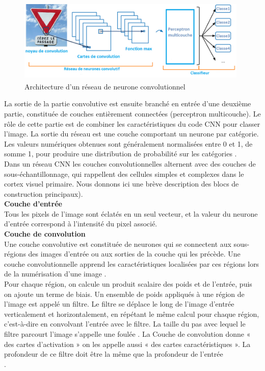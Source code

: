 \begin{figure}[h]
      \centering
      \includegraphics[width=11cm,height=4cm]{images/arch-cnn.png}
      \caption{Architecture d'un réseau de neurone convolutionnel}
    \label{fig:archh}
\end{figure}

La sortie de la partie convolutive est ensuite branché en entrée d’une deuxième partie, constituée de couches entièrement connectées (perceptron multicouche). Le rôle de cette partie est de combiner les caractéristiques du code CNN pour classer l’image. La sortie du réseau est une couche comportant un neurone par catégorie. Les valeurs numériques obtenues sont
généralement normalisées entre 0 et 1, de somme 1, pour produire une distribution de probabilité sur les catégories \cite{58}.\\
Dans un réseau CNN les couches convolutionnelles alternent avec des couches de sous-échantillonnage, qui rappellent des cellules simples et complexes dans le cortex visuel primaire.
Nous donnons ici une brève description des blocs de construction principaux).\\

{\textbf{Couche d'entrée}}\\

Tous les pixels de l’image sont éclatés en un seul vecteur, et la valeur du neurone d’entrée correspond à l’intensité du pixel associé.\\

{\textbf{Couche de convolution}}\\

Une couche convolutive est constituée de neurones qui se connectent aux sous-régions des images d'entrée ou aux sorties de la couche qui les précède. Une couche convolutionnelle apprend les caractéristiques localisées par ces régions lors de la numérisation d'une image \cite{59}.\\
Pour chaque
région, on calcule un produit scalaire des poids et de l'entrée, puis on ajoute un terme de biais.
Un ensemble de poids appliqués à une région de l'image est appelé un filtre. Le filtre se
déplace le long de l'image d'entrée verticalement et horizontalement, en répétant le même calcul
pour chaque région, c'est-à-dire en convolvant l'entrée avec le filtre. La taille du pas avec lequel le
filtre parcourt l’image s'appelle une foulée \cite{59}. La Couche de convolution donne « des cartes
d’activation » on les appelle aussi « des cartes caractéristiques ». La profondeur de ce filtre doit être la même que la profondeur de l'entrée \cite{60}\\.

